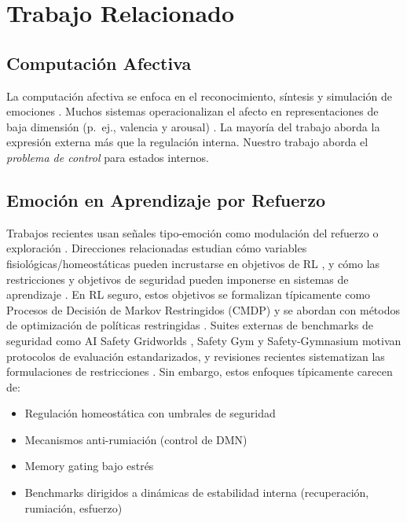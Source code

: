 \documentclass{article}
\begin{document}
\section{Trabajo Relacionado}

\subsection{Computación Afectiva}

La computación afectiva se enfoca en el reconocimiento, síntesis y simulación de emociones \cite{Picard1997, Scherer2010}. Muchos sistemas operacionalizan el afecto en representaciones de baja dimensión (p.\ ej., valencia y arousal) \cite{Russell1980}. La mayoría del trabajo aborda la expresión externa más que la regulación interna. Nuestro trabajo aborda el \textit{problema de control} para estados internos.

\subsection{Emoción en Aprendizaje por Refuerzo}

Trabajos recientes usan señales tipo-emoción como modulación del refuerzo o exploración \cite{Moerland2018}. Direcciones relacionadas estudian cómo variables fisiológicas/homeostáticas pueden incrustarse en objetivos de RL \cite{Keramati2014}, y cómo las restricciones y objetivos de seguridad pueden imponerse en sistemas de aprendizaje \cite{Garcia2015}. En RL seguro, estos objetivos se formalizan típicamente como Procesos de Decisión de Markov Restringidos (CMDP) \cite{Altman1999} y se abordan con métodos de optimización de políticas restringidas \cite{Achiam2017}. Suites externas de benchmarks de seguridad como AI Safety Gridworlds \cite{Leike2017}, Safety Gym \cite{Ray2019} y Safety-Gymnasium \cite{Ji2023} motivan protocolos de evaluación estandarizados, y revisiones recientes sistematizan las formulaciones de restricciones \cite{Wachi2024}. Sin embargo, estos enfoques típicamente carecen de:
\begin{itemize}
    \item Regulación homeostática con umbrales de seguridad
    \item Mecanismos anti-rumiación (control de DMN)
    \item Memory gating bajo estrés
    \item Benchmarks dirigidos a dinámicas de estabilidad interna (recuperación, rumiación, esfuerzo)
\end{itemize}
\end{document}
